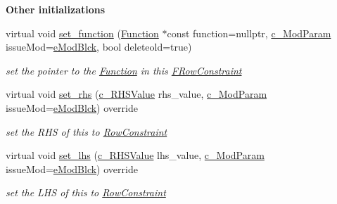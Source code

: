 \begin{Indent}\textbf{ Other initializations}\par
\begin{DoxyCompactItemize}
\item 
virtual void \mbox{\hyperlink{class_s_m_spp__di__unipi__it_1_1_f_row_constraint_a91173cc091286d4bc102d8f54d564c1e}{set\+\_\+function}} (\mbox{\hyperlink{class_s_m_spp__di__unipi__it_1_1_function}{Function}} $\ast$const function=nullptr, \mbox{\hyperlink{group___modification___t_y_p_e_s_ga544246d8c462e9a2d817c2c30797968f}{c\+\_\+\+Mod\+Param}} issue\+Mod=\mbox{\hyperlink{group___modification___t_y_p_e_s_gga48fddcdd03a03f49b7e389ca1ed938d4a21b14b26b1c0093a0905f6fc010bad29}{e\+Mod\+Blck}}, bool deleteold=true)
\begin{DoxyCompactList}\small\item\em set the pointer to the \mbox{\hyperlink{class_s_m_spp__di__unipi__it_1_1_function}{Function}} in this \mbox{\hyperlink{class_s_m_spp__di__unipi__it_1_1_f_row_constraint}{F\+Row\+Constraint}} \end{DoxyCompactList}\item 
virtual void \mbox{\hyperlink{class_s_m_spp__di__unipi__it_1_1_f_row_constraint_a921fe527a5e01a2f6568c3d5d233380a}{set\+\_\+rhs}} (\mbox{\hyperlink{class_s_m_spp__di__unipi__it_1_1_row_constraint_a34abd4b01d3a2024be5f6d13dd88779f}{c\+\_\+\+R\+H\+S\+Value}} rhs\+\_\+value, \mbox{\hyperlink{group___modification___t_y_p_e_s_ga544246d8c462e9a2d817c2c30797968f}{c\+\_\+\+Mod\+Param}} issue\+Mod=\mbox{\hyperlink{group___modification___t_y_p_e_s_gga48fddcdd03a03f49b7e389ca1ed938d4a21b14b26b1c0093a0905f6fc010bad29}{e\+Mod\+Blck}}) override
\begin{DoxyCompactList}\small\item\em set the R\+HS of this to \mbox{\hyperlink{class_s_m_spp__di__unipi__it_1_1_row_constraint}{Row\+Constraint}} \end{DoxyCompactList}\item 
virtual void \mbox{\hyperlink{class_s_m_spp__di__unipi__it_1_1_f_row_constraint_a04d6bd47ee1aef8d3bfa2486b2732bd3}{set\+\_\+lhs}} (\mbox{\hyperlink{class_s_m_spp__di__unipi__it_1_1_row_constraint_a34abd4b01d3a2024be5f6d13dd88779f}{c\+\_\+\+R\+H\+S\+Value}} lhs\+\_\+value, \mbox{\hyperlink{group___modification___t_y_p_e_s_ga544246d8c462e9a2d817c2c30797968f}{c\+\_\+\+Mod\+Param}} issue\+Mod=\mbox{\hyperlink{group___modification___t_y_p_e_s_gga48fddcdd03a03f49b7e389ca1ed938d4a21b14b26b1c0093a0905f6fc010bad29}{e\+Mod\+Blck}}) override
\begin{DoxyCompactList}\small\item\em set the L\+HS of this to \mbox{\hyperlink{class_s_m_spp__di__unipi__it_1_1_row_constraint}{Row\+Constraint}} \end{DoxyCompactList}\item 

\end{DoxyCompactItemize}
\end{Indent}
